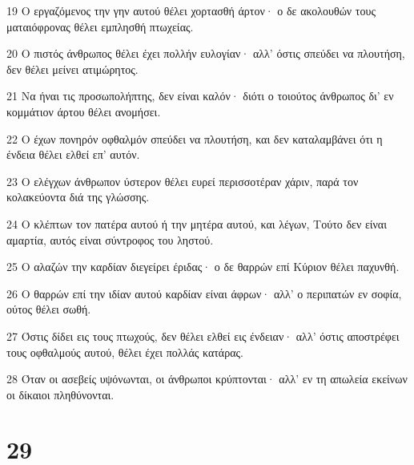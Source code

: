 \par 19 Ο εργαζόμενος την γην αυτού θέλει χορτασθή άρτον· ο δε ακολουθών τους ματαιόφρονας θέλει εμπλησθή πτωχείας.
\par 20 Ο πιστός άνθρωπος θέλει έχει πολλήν ευλογίαν· αλλ' όστις σπεύδει να πλουτήση, δεν θέλει μείνει ατιμώρητος.
\par 21 Να ήναι τις προσωπολήπτης, δεν είναι καλόν· διότι ο τοιούτος άνθρωπος δι' εν κομμάτιον άρτου θέλει ανομήσει.
\par 22 Ο έχων πονηρόν οφθαλμόν σπεύδει να πλουτήση, και δεν καταλαμβάνει ότι η ένδεια θέλει ελθεί επ' αυτόν.
\par 23 Ο ελέγχων άνθρωπον ύστερον θέλει ευρεί περισσοτέραν χάριν, παρά τον κολακεύοντα διά της γλώσσης.
\par 24 Ο κλέπτων τον πατέρα αυτού ή την μητέρα αυτού, και λέγων, Τούτο δεν είναι αμαρτία, αυτός είναι σύντροφος του ληστού.
\par 25 Ο αλαζών την καρδίαν διεγείρει έριδας· ο δε θαρρών επί Κύριον θέλει παχυνθή.
\par 26 Ο θαρρών επί την ιδίαν αυτού καρδίαν είναι άφρων· αλλ' ο περιπατών εν σοφία, ούτος θέλει σωθή.
\par 27 Όστις δίδει εις τους πτωχούς, δεν θέλει ελθεί εις ένδειαν· αλλ' όστις αποστρέφει τους οφθαλμούς αυτού, θέλει έχει πολλάς κατάρας.
\par 28 Όταν οι ασεβείς υψόνωνται, οι άνθρωποι κρύπτονται· αλλ' εν τη απωλεία εκείνων οι δίκαιοι πληθύνονται.

\chapter{29}

